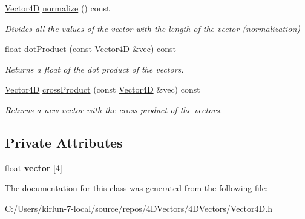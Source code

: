 \begin{DoxyCompactItemize}
\mbox{\label{class_vector4_d_a282d4e445811507686efec7dd7e22e49}} 
\mbox{\hyperlink{class_vector4_d}{Vector4D}} \mbox{\hyperlink{class_vector4_d_a282d4e445811507686efec7dd7e22e49}{normalize}} () const
\begin{DoxyCompactList}\small\item\em Divides all the values of the vector with the length of the vector (normalization) \end{DoxyCompactList}\item 
\mbox{\label{class_vector4_d_a975ab5c3f1cbad6d721261a511021d5f}} 
float \mbox{\hyperlink{class_vector4_d_a975ab5c3f1cbad6d721261a511021d5f}{dot\+Product}} (const \mbox{\hyperlink{class_vector4_d}{Vector4D}} \&vec) const
\begin{DoxyCompactList}\small\item\em Returns a float of the dot product of the vectors. \end{DoxyCompactList}\item 
\mbox{\label{class_vector4_d_a970b977c40680f38cb716d736e33faf6}} 
\mbox{\hyperlink{class_vector4_d}{Vector4D}} \mbox{\hyperlink{class_vector4_d_a970b977c40680f38cb716d736e33faf6}{cross\+Product}} (const \mbox{\hyperlink{class_vector4_d}{Vector4D}} \&vec) const
\begin{DoxyCompactList}\small\item\em Returns a new vector with the cross product of the vectors. \end{DoxyCompactList}\end{DoxyCompactItemize}
\subsection*{Private Attributes}
\begin{DoxyCompactItemize}
\item 
\mbox{\label{class_vector4_d_af915ffef477aabadd220512e95cf2013}} 
float {\bfseries vector} \mbox{[}4\mbox{]}
\end{DoxyCompactItemize}


The documentation for this class was generated from the following file\+:\begin{DoxyCompactItemize}
\item 
C\+:/\+Users/kirlun-\/7-\/local/source/repos/4\+D\+Vectors/4\+D\+Vectors/Vector4\+D.\+h\end{DoxyCompactItemize}

